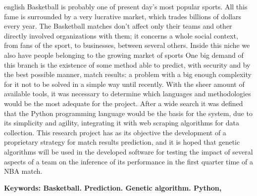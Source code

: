 \documentclass[brazilian]{ifsc-tcc}
\begin{document}
\begin{resumo}[Abstract]
\begin{otherlanguage*}{english}
Basketball is probably one of present day's most popular sports. All this fame is surrounded by a very lucrative market, which trades billions of dollars every year. The Basketball matches don't affect only their teams and other directly involved organizations with them; it concerns a whole social context, from fans of the sport, to businesses, between several others. Inside this niche we also have people belonging to the growing market of sports
One big demand of this branch is the existence of some method able to predict, with security and by the best possible manner, match results: a problem with a big enough complexity for it not to be solved in a simple way until recently.
With the sheer amount of available tools, it was necessary to determine which languages and methodologies would be the most adequate for the project. After a wide search it was defined that the Python programming language would be the basis for the system, due to its simplicity and agility, integrating it with web scraping algorithms for data collection.
This research project has as its objective the development of a proprietary strategy for match results prediction, and it is hoped that genetic algorithms will be used in the developed software for testing the impact of several aspects of a team on the inference of its performance in the first quarter time of a NBA match.

\noindent \textbf{Keywords: Basketball. Prediction. Genetic algorithm. Python,}

\end{otherlanguage*}
\end{resumo}


\listoffigures*
\cleardoublepage

\listoftables*
\cleardoublepage



\listadeabreviaturas
\cleardoublepage

\tableofcontents*
\cleardoublepage

      
\textual
\end{document}
